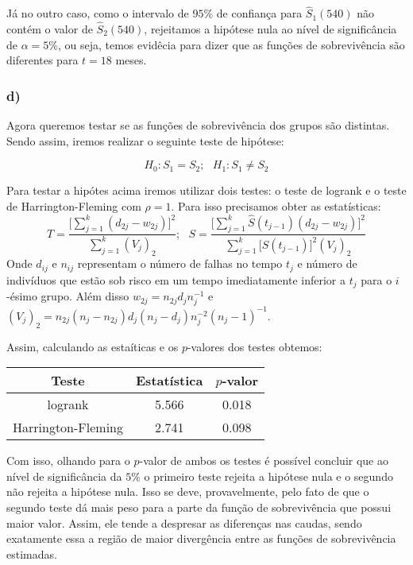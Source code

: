 \documentclass[
]{article}
\begin{document}
Já no outro caso, como o intervalo de \(95\%\) de confiança para
\(\hat{S}_{1}(540)\) não contém o valor de \(\hat{S}_{2}(540)\),
rejeitamos a hipótese nula ao nível de significância de
\(\alpha = 5\%\), ou seja, temos evidêcia para dizer que as funções de
sobrevivência são diferentes para \(t = 18\) meses.

\hypertarget{d-1}{%
\subsubsection{d)}\label{d-1}}

Agora queremos testar se as funções de sobrevivência dos grupos são
distintas. Sendo assim, iremos realizar o seguinte teste de hipótese:

\[H_{0}: S_{1} = S_{2}; \ \ \ H_{1}: S_{1} \neq S_{2}\]

Para testar a hipótes acima iremos utilizar dois testes: o teste de
logrank e o teste de Harrington-Fleming com \(\rho = 1\). Para isso
precisamos obter as estatísticas:
\[ T = \dfrac{\displaystyle \Bigg[\sum_{j = 1}^{k}(d_{2j}-w_{2j}) \Bigg]^{2}}{\displaystyle \sum_{j=1}^{k}(V_{j})_{2}}; \ \ \ S =  \dfrac{\displaystyle \Bigg[\sum_{j = 1}^{k}\hat{S}(t_{j-1})(d_{2j}-w_{2j}) \Bigg]^{2}}{\displaystyle \sum_{j=1}^{k}\bigg[\hat{S}(t_{j-1})\bigg]^{2}(V_{j})_{2}}\]
Onde \(d_{ij}\) e \(n_{ij}\) representam o número de falhas no tempo
\(t_{j}\) e número de indivíduos que estão sob risco em um tempo
imediatamente inferior a \(t_{j}\) para o \(i\)-ésimo grupo. Além disso
\(w_{2j} = n_{2j}d_{j}n_{j}^{-1}\) e
\((V_{j})_{2} = n_{2j}(n_{j}-n_{2j})d_{j}(n_{j}-d_{j})n_{j}^{-2}(n_{j}-1)^{-1}\).

Assim, calculando as estaíticas e os \(p\)-valores dos testes obtemos:

\begin{table}[H]
\centering
\begin{tabular}{ccc}
\toprule
Teste & Estatística & $p$-valor\\
\midrule
logrank & 5.566 & 0.018\\
Harrington-Fleming & 2.741 & 0.098\\
\bottomrule
\end{tabular}
\end{table}

Com isso, olhando para o \(p\)-valor de ambos os testes é possível
concluir que ao nível de significância da \(5\%\) o primeiro teste
rejeita a hipótese nula e o segundo não rejeita a hipótese nula. Isso se
deve, provavelmente, pelo fato de que o segundo teste dá mais peso para
a parte da função de sobrevivência que possui maior valor. Assim, ele
tende a despresar as diferenças nas caudas, sendo exatamente essa a
região de maior divergência entre as funções de sobrevivência estimadas.
\end{document}
